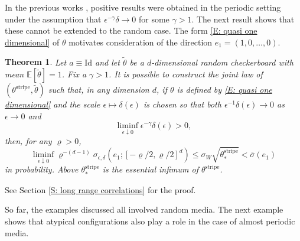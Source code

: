 \documentclass[10pt,a4paper]{amsart}
\newtheorem{theorem}{Theorem}
\begin{document}
In the previous works \cite{ansini_braides_chiado-piat,hagerty}, positive results were obtained in the periodic setting under the assumption that $\epsilon^{- \gamma } \delta \to 0$ for some $\gamma > 1$.  The next result shows that these cannot be extended to the random case.  The form \eqref{E: quasi one dimensional} of $\theta$ motivates consideration of the direction $e_{1} = (1,0,\dots,0)$.

	\begin{theorem} \label{T: algebraic correlation counterexample}Let $a \equiv \text{Id}$ and let $\tilde{\theta}$ be a $d$-dimensional random checkerboard with mean $\mathbb{E}[\tilde{\theta}] = 1$.  Fix a $\gamma > 1$.  It is possible to construct the joint law of $(\theta^{\text{stripe}},\tilde{\theta})$ such that,  in any dimension $d$, if $\theta$ is defined by \eqref{E: quasi one dimensional} and the scale $\epsilon \mapsto \delta(\epsilon)$ is chosen so that both $\epsilon^{-1} \delta(\epsilon) \to 0$ as $\epsilon \to 0$ and
		\begin{equation*}
			\liminf_{\epsilon \downarrow 0} \epsilon^{-\gamma} \delta(\epsilon) > 0,
		\end{equation*}
	then, for any $\varrho > 0$,
		\begin{equation} \label{E: algebraic correlations lim inf}
			\liminf_{ \epsilon \downarrow 0 } \varrho^{-(d-1)} \sigma_{\epsilon,\delta}(e_{1} ; [-\varrho/2,\varrho/2]^{d} )  \leq \sigma_{W} \sqrt{\theta^{\text{stripe}}_{*}}  < \bar{\sigma}(e_{1})
		\end{equation}
	in probability.  Above $\theta_{*}^{\text{stripe}}$ is the essential infimum of $\theta^{\text{stripe}}$.\end{theorem}

See Section \ref{S: long range correlations} for the proof.
		
So far, the examples discussed all involved random media.  The next example shows that atypical configurations also play a role in the case of almost periodic media.  
\end{document}
